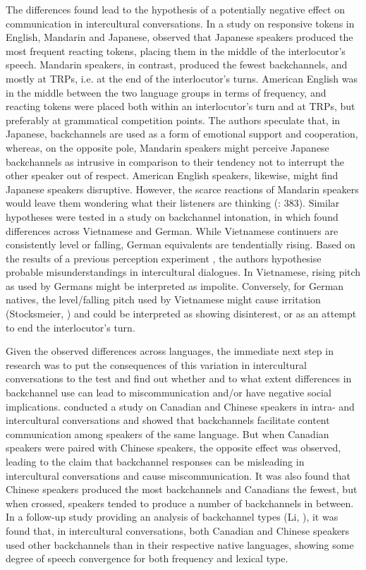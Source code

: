 The differences found lead to the hypothesis of a potentially negative effect on communication in intercultural conversations. In a study on responsive tokens in English, Mandarin and Japanese, \citet{ClancyEtAl1996} observed that Japanese speakers produced the most frequent reacting tokens, placing them in the middle of the interlocutor’s speech. Mandarin speakers, in contrast, produced the fewest backchannels, and mostly at TRPs, i.e. at the end of the interlocutor’s turns. American English was in the middle between the two language groups in terms of frequency, and reacting tokens were placed both within an interlocutor’s turn and at TRPs, but preferably at grammatical competition points. The authors speculate that, in Japanese, backchannels are used as a form of emotional support and cooperation, whereas, on the opposite pole, Mandarin speakers might perceive Japanese backchannels as intrusive in comparison to their tendency not to interrupt the other speaker out of respect. American English speakers, likewise, might find Japanese speakers disruptive. However, the scarce reactions of Mandarin speakers would leave them wondering what their listeners are thinking (\citealt{ClancyEtAl1996}: 383). Similar hypotheses were tested in a study on backchannel intonation, in which \citet{HaEtAl2016} found differences across Vietnamese and German. While Vietnamese continuers are consistently level or falling, German equivalents are tendentially rising. Based on the results of a previous perception experiment \citep{Ha2012}, the authors hypothesise probable misunderstandings in intercultural dialogues. In Vietnamese, rising pitch as used by Germans might be interpreted as impolite. Conversely, for German natives, the level/falling pitch used by Vietnamese might cause irritation (Stocksmeier, \citealt{KoppGibbon2007}) and could be interpreted as showing disinterest, or as an attempt to end the interlocutor’s turn.

Given the observed differences across languages, the immediate next step in research was to put the consequences of this variation in intercultural conversations to the test and find out whether and to what extent differences in backchannel use can lead to miscommunication and/or have negative social implications. \citet{Li2006} conducted a study on Canadian and Chinese speakers in intra- and intercultural conversations and showed that backchannels facilitate content communication among speakers of the same language. But when Canadian speakers were paired with Chinese speakers, the opposite effect was observed, leading to the claim that backchannel responses can be misleading in intercultural conversations and cause miscommunication. It was also found that Chinese speakers produced the most backchannels and Canadians the fewest, but when crossed, speakers tended to produce a number of backchannels in between. In a follow-up study providing an analysis of backchannel types (Li, \citealt{CuiWang2010}), it was found that, in intercultural conversations, both Canadian and Chinese speakers used other backchannels than in their respective native languages, showing some degree of speech convergence for both frequency and lexical type.

